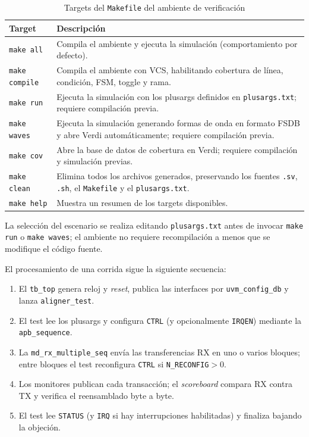 \documentclass[conference]{IEEEtran}
\begin{document}
\begin{table}[H]
\caption{Targets del \texttt{Makefile} del ambiente de verificación}
\label{tab:makefile}
\centering
\footnotesize
\begin{tabular}{@{}lp{5.2cm}@{}}
\toprule
\textbf{Target} & \textbf{Descripción} \\
\midrule
\texttt{make all}     & Compila el ambiente y ejecuta la simulación (comportamiento por defecto). \\
\texttt{make compile} & Compila el ambiente con VCS, habilitando cobertura de línea, condición, FSM, toggle y rama. \\
\texttt{make run}     & Ejecuta la simulación con los plusargs definidos en \texttt{plusargs.txt}; requiere compilación previa. \\
\texttt{make waves}   & Ejecuta la simulación generando formas de onda en formato FSDB y abre Verdi automáticamente; requiere compilación previa. \\
\texttt{make cov}     & Abre la base de datos de cobertura en Verdi; requiere compilación y simulación previas. \\
\texttt{make clean}   & Elimina todos los archivos generados, preservando los fuentes \texttt{.sv}, \texttt{.sh}, el \texttt{Makefile} y el \texttt{plusargs.txt}. \\
\texttt{make help}    & Muestra un resumen de los targets disponibles. \\
\bottomrule
\end{tabular}
\end{table}

La selección del escenario se realiza editando \texttt{plusargs.txt}
antes de invocar \texttt{make run} o \texttt{make waves}; el ambiente
no requiere recompilación a menos que se modifique el código fuente.

El procesamiento de una corrida sigue la siguiente secuencia:
\begin{enumerate}
  \item El \texttt{tb\_top} genera reloj y \textit{reset}, publica las
  interfaces por \texttt{uvm\_config\_db} y lanza \texttt{aligner\_test}.
  \item El test lee los plusargs y configura \texttt{CTRL} (y opcionalmente
  \texttt{IRQEN}) mediante la \texttt{apb\_sequence}.
  \item La \texttt{md\_rx\_multiple\_seq} envía las transferencias RX en uno o
  varios bloques; entre bloques el test reconfigura \texttt{CTRL} si
  \texttt{N\_RECONFIG}$>0$.
  \item Los monitores publican cada transacción; el \textit{scoreboard} compara
  RX contra TX y verifica el reensamblado byte a byte.
  \item El test lee \texttt{STATUS} (y \texttt{IRQ} si hay interrupciones
  habilitadas) y finaliza bajando la objeción.
\end{enumerate}
\end{document}
